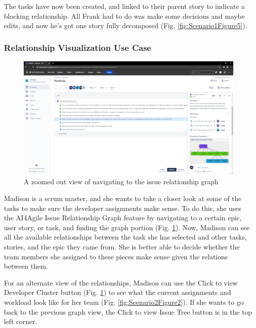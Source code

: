 The tasks have now been created, and linked to their parent story to indicate a blocking relationship. All Frank had to do was make some decisions and maybe edits, and now he’s got one story fully decomposed (Fig. \ref{fig:Scenario1Figure5}).

\subsubsection{Relationship Visualization Use Case}
\label{Scenario2}

\begin{figure}
\centering
\includegraphics[width=\textwidth,keepaspectratio]{./figure/Scenario2Figure1.png}
\caption{A zoomed out view of navigating to the issue relationship graph}
\label{fig:Scenario2Figure1}
\end{figure}

Madison is a scrum master, and she wants to take a closer look at some of the tasks to make sure the developer assignments make sense. To do this, she uses the AI4Agile Issue Relationship Graph feature by navigating to a certain epic, user story, or task, and finding the graph portion (Fig. \ref{fig:Scenario2Figure1}). Now, Madison can see all the available relationships between the task she has selected and other tasks, stories, and the epic they came from. She is better able to decide whether the team members she assigned to these pieces make sense given the relations between them.

For an alternate view of the relationships, Madison can use the Click to view Developer Cluster button (Fig. \ref{fig:Scenario2Figure1}) to see what the current assignments and workload look like for her team (Fig. \ref{fig:Scenario2Figure2}). If she wants to go back to the previous graph view, the Click to view Issue Tree button is in the top left corner.

